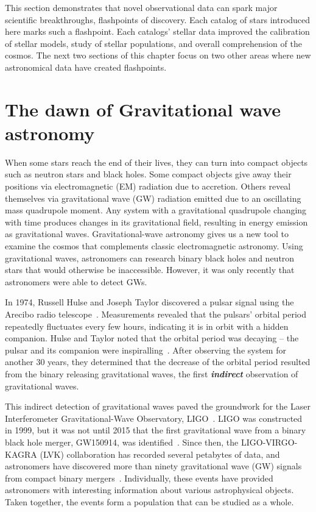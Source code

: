 This section demonstrates that novel observational data can spark major scientific breakthroughs, flashpoints of discovery. 
Each catalog of stars introduced here marks such a flashpoint. 
Each catalogs' stellar data improved the calibration of stellar models, study of stellar populations, and  overall comprehension of the cosmos. 
The next two sections of this chapter focus on two other areas where new astronomical data have created flashpoints. 

\section{The dawn of Gravitational wave astronomy}

When some stars reach the end of their lives, they can turn into compact objects such as neutron stars and black holes. 
Some compact objects give away their positions via electromagnetic (EM) radiation due to accretion. 
Others reveal themselves via gravitational wave (GW) radiation emitted due to an oscillating mass quadrupole moment.
Any system with a gravitational quadrupole changing with time produces changes in its gravitational field, resulting in energy emission as gravitational waves.
Gravitational-wave astronomy gives us a new tool to examine the cosmos that complements classic electromagnetic astronomy.
Using gravitational waves, astronomers can research binary black holes and neutron stars that would otherwise be inaccessible.
However, it was only recently that astronomers were able to detect GWs. 

In 1974, Russell Hulse and Joseph Taylor discovered a pulsar signal using the Arecibo radio telescope~\cite{Hulse:1975:ApJL}.
Measurements revealed that the pulsars' orbital period repeatedly fluctuates every few hours, indicating it is in orbit with a hidden companion.
Hulse and Taylor noted that the orbital period was decaying -- the pulsar and its companion were inspiralling~\cite{Hulse:1975:ApJL}.
After observing the system for another 30 years, they determined that the decrease of the orbital period resulted from the binary releasing gravitational waves, the first \textit{\textbf{indirect}} observation of gravitational waves.

This indirect detection of gravitational waves paved the groundwork for the Laser Interferometer Gravitational-Wave Observatory, LIGO~\cite{Barish:1999:PhT}. 
LIGO was constructed in 1999, but it was not until 2015 that the first gravitational wave from a binary black hole merger, GW150914, was identified~\cite{abbott2016observation}.
Since then, the LIGO-VIRGO-KAGRA (LVK) collaboration has recorded several petabytes of data, and astronomers have discovered more than ninety gravitational wave (GW) signals from compact binary mergers~\cite{abbott2019gwtc, gwtc2, gwtc3}.
Individually, these events have provided astronomers with interesting information about various astrophysical objects. 
Taken together, the events form a population that can be studied as a whole. 


